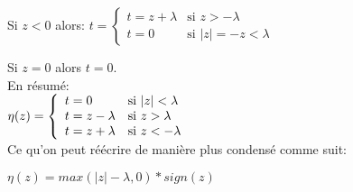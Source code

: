 \documentclass{article}
\begin{document}
Si $z < 0$ alors: 
$t = \left\{
    \begin{array}{lll}
        t = z + \lambda & \mbox{si } z > - \lambda \\
        t = 0 & \mbox{si } |z| = -z < \lambda 
    \end{array}
\right.$

Si $z = 0$ alors $t = 0$.\\

En résumé:\\
 
$\eta(z) = \left\{
    \begin{array}{lll}
        t = 0 & \mbox{si } |z| < \lambda \\
        t = z - \lambda & \mbox{si } z > \lambda \\
        t = z + \lambda & \mbox{si } z < - \lambda 
    \end{array}
\right. \\ $ \\

Ce qu'on peut réécrire de manière plus condensé comme suit:

$\eta(z) = max(|z| - \lambda,0)*sign(z)$
\end{document}
